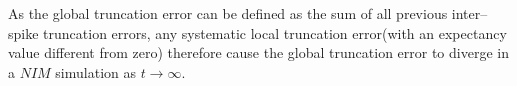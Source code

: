 	As the global truncation error can be defined as the sum of all previous inter--spike truncation errors, 
		any systematic local truncation error(with an expectancy value different from zero) therefore cause the global truncation error to diverge in a $NIM$ simulation as $t\to\infty$.
	



















	
